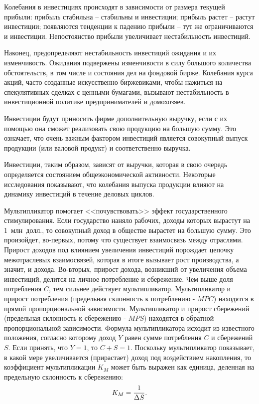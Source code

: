Колебания в инвестициях происходят в зависимости от размера текущей прибыли:
прибыль стабильна -- стабильны и инвестиции; прибыль растет -- растут
инвестиции; появляются тенденции к падению прибыли -- тут же ограничиваются и
инвестиции. Непостоянство прибыли увеличивает нестабильность инвестиций.

Наконец, предопределяют нестабильность инвестиций ожидания и их изменчивость.
Ожидания подвержены изменчивости в силу большого количества обстоятельств, в
том числе и состояния дел на фондовой бирже. Колебания курса акций, часто
созданные искусственно биржевиками, чтобы нажиться на спекулятивных сделках с
ценными бумагами, вызывают нестабильность в инвестиционной политике
предпринимателей и домохозяев.

Инвестиции будут приносить фирме дополнительную выручку, если с их помощью она
сможет реализовать свою продукцию на большую сумму. Это означает, что очень
важным фактором инвестиций является совокупный выпуск продукции (или валовой
продукт) и соответственно выручка.

Инвестиции, таким образом, зависят от выручки, которая в свою очередь
определяется состоянием общеэкономической активности. Некоторые исследования
показывают, что колебания выпуска продукции влияют на динамику инвестиций в
течение деловых циклов.

Мультипликатор помогает <<почувствовать>> эффект государственного
стимулирования. Если государство наняло рабочих, доходы которых вырастут на
1~млн~долл., то совокупный доход в обществе вырастет на большую сумму. Это
произойдет, во-первых, потому что существует взаимосвязь между отраслями.
Прирост доходов под влиянием увеличения инвестиций порождает цепочку
межотраслевых взаимосвязей, которая в итоге вызывает рост производства, а
значит, и дохода. Во-вторых, прирост дохода, возникший от увеличения объема
инвестиций, делится на личное потребление и сбережение. Чем выше доля
потребления \( C \), тем сильнее действует мультипликатор. Мультипликатор и
прирост потребления (предельная склонность к потреблению - \( MPC \)) находятся
в прямой пропорциональной зависимости. Мультипликатор и прирост сбережений
(предельная склонность к сбережению - \( MPS \)) находятся в обратной
пропорциональной зависимости. Формула мультипликатора исходит из известного
положения, согласно которому доход \( Y \) равен сумме потребления \( C \) и
сбережений \( S \). Если принять, что \( Y = 1 \), то \( C + S = 1 \).
Поскольку мультипликатор показывает, в какой мере увеличивается (прирастает)
доход под воздействием накопления, то коэффициент мультипликации \( K_M \)
может быть выражен как единица, деленная на предельную склонность к сбережению:
\[
    K_M = \frac{1}{\Delta S}.
\]

